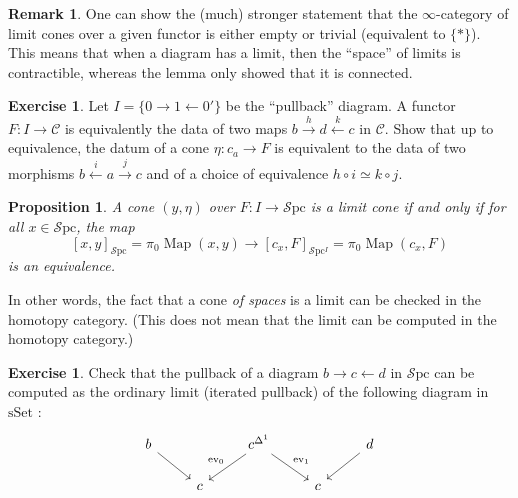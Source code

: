 \documentclass[11pt]{article}
\newtheorem{proposition}[theorem]{Proposition}
\theoremstyle{definition}
\newtheorem{remark}[theorem]{Remark}
\newtheorem{exercise}[theorem]{Exercise}
\newcommand{\C}{\mathcal{C}}
\newcommand{\Map}{\operatorname{Map}}
\newcommand{\Spc}{\mathcal{S}\mathrm{pc}}
\newcommand{\sSet}{\mathrm{sSet}}
\begin{document}
\begin{remark}
    One can show the (much) stronger statement that the $\infty$-category of limit cones over a given functor is either empty or trivial (equivalent to $\{*\}$).
    This means that when a diagram has a limit, then the \enquote{space} of limits is contractible, whereas the lemma only showed that it is connected.
\end{remark}

\begin{exercise}
    Let $I = \{0 \to 1 \leftarrow 0'\}$ be the \enquote{pullback} diagram.
    A functor $F : I \to \C$ is equivalently the data of two maps $b \xrightarrow{h} d \xleftarrow{k} c$ in $\C$.
    Show that up to equivalence, the datum of a cone $\eta : c_a \to F$ is equivalent to the data of two morphisms $b \xleftarrow{i} a \xrightarrow{j} c$ and of a choice of equivalence $h \circ i \simeq k \circ j$.
\end{exercise}

\begin{proposition}
    A cone $(y, \eta)$ over $F : I \to \Spc$ is a limit cone if and only if for all $x \in \Spc$, the map
    \[
        [x, y]_{\Spc} = \pi_0 \Map(x, y) \to [c_x, F]_{\Spc^I} = \pi_0 \Map(c_x, F)
    \]
    is an equivalence.
\end{proposition}
In other words, the fact that a cone \emph{of spaces} is a limit can be checked in the homotopy category.
(This does not mean that the limit can be computed in the homotopy category.)

\begin{exercise}
    Check that the pullback of a diagram $b \to c \leftarrow d$ in $\Spc$ can be computed as the ordinary limit (iterated pullback) of the following diagram in $\sSet$ :
    \[\begin{tikzcd}
        b && {c^{\Delta^1}} && d \\
        & c && c
        \arrow[from=1-1, to=2-2]
        \arrow["{\mathrm{ev}_0}"', from=1-3, to=2-2]
        \arrow["{\mathrm{ev}_1}", from=1-3, to=2-4]
        \arrow[from=1-5, to=2-4]
    \end{tikzcd}\]
\end{exercise}
\end{document}
